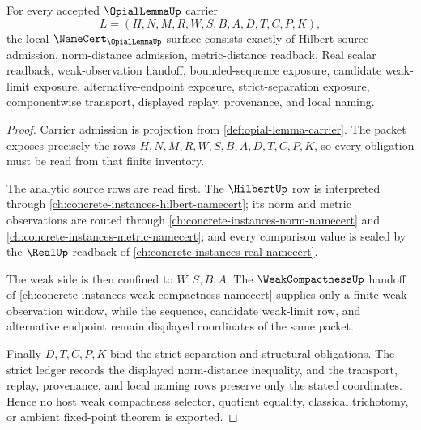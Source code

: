 \begin{theorem}
\label{thm:opial-lemma-namecert-obligations}
For every accepted $\OpialLemmaUp$ carrier
$$
L=(H,N,M,R,W,S,B,A,D,T,C,P,K),
$$
the local $\NameCert_{\OpialLemmaUp}$ surface consists exactly of Hilbert source admission, norm-distance admission, metric-distance readback, Real scalar readback, weak-observation handoff, bounded-sequence exposure, candidate weak-limit exposure, alternative-endpoint exposure, strict-separation exposure, componentwise transport, displayed replay, provenance, and local naming.
\end{theorem}
\begin{proof}
Carrier admission is projection from \autoref{def:opial-lemma-carrier}. The packet exposes precisely the rows $H,N,M,R,W,S,B,A,D,T,C,P,K$, so every obligation must be read from that finite inventory.

The analytic source rows are read first. The $\HilbertUp$ row is interpreted through \autoref{ch:concrete-instances-hilbert-namecert}; its norm and metric observations are routed through \autoref{ch:concrete-instances-norm-namecert} and \autoref{ch:concrete-instances-metric-namecert}; and every comparison value is sealed by the $\RealUp$ readback of \autoref{ch:concrete-instances-real-namecert}.

The weak side is then confined to $W,S,B,A$. The $\WeakCompactnessUp$ handoff of \autoref{ch:concrete-instances-weak-compactness-namecert} supplies only a finite weak-observation window, while the sequence, candidate weak-limit row, and alternative endpoint remain displayed coordinates of the same packet.

Finally $D,T,C,P,K$ bind the strict-separation and structural obligations. The strict ledger records the displayed norm-distance inequality, and the transport, replay, provenance, and local naming rows preserve only the stated coordinates. Hence no host weak compactness selector, quotient equality, classical trichotomy, or ambient fixed-point theorem is exported.
\end{proof}


